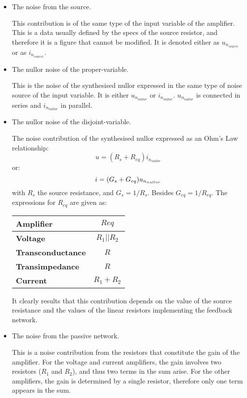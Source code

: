\documentclass{ecctd01}
\begin{document}
\begin{itemize}
\item The noise from the source.\par
This contribution is of the same type of the input variable of the
amplifier. This is a data usually defined by the specs of the
source resistor, and therefore it is a figure that cannot be modified.
It is denoted either as $u_{n_{source}}$ or as $i_{n_{source}}$.
\item The nullor noise of the proper-variable.\par
This is the noise of the synthesised nullor expressed in the same
type of noise source of the input variable.
It is either $u_{n_{nullor}}$ or $i_{n_{nullor}}$.
$u_{n_{nullor}}$ is connected in series and
$i_{n_{nullor}}$ in parallel.
\end{itemize}
\par
\hrulefill\vspace{10.0cm}
\par
\hrulefill
\begin{itemize}
\item The nullor noise of the disjoint-variable.\par
The noise contribution of the synthesised nullor expressed as an
Ohm's Law relationship:\vspace{-0.5ex}
\begin{displaymath}
u = (R_s + R_{eq}) i_{n_{nullor}}
\end{displaymath}
or:\vspace{-0.5ex}
\begin{displaymath}
i = (G_s + G_{eq}) u_{n_{nullor}}\vspace{-0.5ex}
\end{displaymath}
with $R_s$ the source resistance, and $G_s = 1/R_s$. Besides
$G_{eq} = 1/R_{eq}$.
The expressions for $R_{eq}$ are given as:\par
\begin{center}
\begin{tabular}{||l|c||}\hline\hline
Amplifier & $Req$ \\\hline\hline
{\bfseries \sffamily Voltage} & $R_1||R_2$ \\\hline
{\bfseries \sffamily Transconductance} & $R$ \\\hline
{\bfseries \sffamily Transimpedance} & $R$ \\\hline
{\bfseries \sffamily Current} & $R_1 + R_2$ \\\hline\hline
\end{tabular}
\end{center}
It clearly results that this contribution depends on the value of the
source resistance and the values of the linear resistors implementing
the feedback network.
\item The noise from the passive network.\par
This is a noise contribution from the resistors that constitute the
gain of the amplifier. For the voltage and current amplifiers, the gain
involves two resistors ($R_1$ and $R_2$), and thus two terms in the
sum arise. For the other amplifiers, the gain is determined by a
single resistor, therefore only one term appears in the sum.
\end{itemize}
\end{document}
